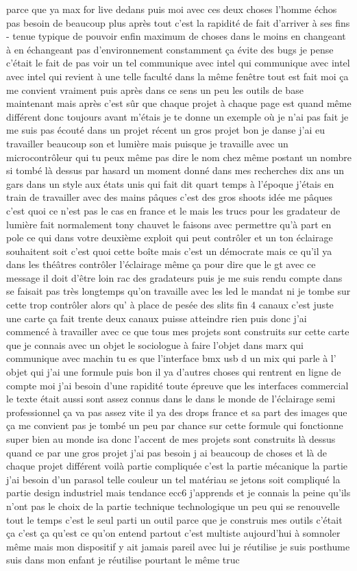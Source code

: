 parce que ya max for live dedans puis moi avec ces deux choses l'homme échos pas besoin de beaucoup plus après tout c'est la rapidité de fait d'arriver à ses fins - tenue typique de pouvoir enfin maximum de choses dans le moins en changeant à en échangeant pas d'environnement constamment ça évite des bugs je pense c'était le fait de pas voir un tel communique avec intel qui communique avec intel avec intel qui revient à une telle faculté dans la même fenêtre tout est fait moi ça me convient vraiment puis après dans ce sens un peu les outils de base maintenant mais après c'est sûr que chaque projet à chaque page est quand même différent donc toujours avant m'étais je te donne un exemple où je n'ai pas fait je me suis pas écouté dans un projet récent un gros projet bon je danse j'ai eu travailler beaucoup son et lumière mais puisque je travaille avec un microcontrôleur qui tu peux même pas dire le nom chez même postant un nombre si tombé là dessus par hasard un moment donné dans mes recherches dix ans un gars dans un style aux états unis qui fait dit quart temps à l'époque j'étais en train de travailler avec des mains pâques c'est des gros shoots idée me pâques c'est quoi ce n'est pas le cas en france et le mais les trucs pour les gradateur de lumière fait normalement tony chauvet le faisons avec permettre qu'à part en pole ce qui dans votre deuxième exploit qui peut contrôler et un ton éclairage souhaitent soit c'est quoi cette boîte mais c'est un démocrate mais ce qu'il ya dans les théâtres contrôler l'éclairage même ça pour dire que le gt avec ce message il doit d'être loin rac des gradateurs puis je me suis rendu compte dans se faisait pas très longtemps qu'on travaille avec les led le mandat ni je tombe sur cette trop contrôler alors qu' à place de pesée des slits fin 4 canaux c'est juste une carte ça fait trente deux canaux puisse atteindre rien puis donc j'ai commencé à travailler avec ce que tous mes projets sont construits sur cette carte que je connais avec un objet le sociologue à faire l'objet dans marx qui communique avec machin tu es que l'interface bmx usb d un mix qui parle à l' objet qui j'ai une formule puis bon il ya d'autres choses qui rentrent en ligne de compte moi j'ai besoin d'une rapidité toute épreuve que les interfaces commercial le texte était aussi sont assez connus dans le dans le monde de l'éclairage semi professionnel ça va pas assez vite il ya des drops france et sa part des images que ça me convient pas je tombé un peu par chance sur cette formule qui fonctionne super bien au monde isa donc l'accent de mes projets sont construits là dessus quand ce par une gros projet j'ai pas besoin j ai beaucoup de choses et là de chaque projet différent voilà partie compliquée c'est la partie mécanique la partie j'ai besoin d'un parasol telle couleur un tel matériau se jetons soit compliqué la partie design industriel mais tendance ecc6 j'apprends et je connais la peine qu'ils n'ont pas le choix de la partie technique technologique un peu qui se renouvelle tout le temps c'est le seul parti un outil parce que je construis mes outils c'était ça c'est ça qu'est ce qu'on entend partout c'est multiste aujourd'hui à somnoler même mais mon dispositif y ait jamais pareil avec lui je réutilise je suis posthume suis dans mon enfant je réutilise pourtant le même truc 